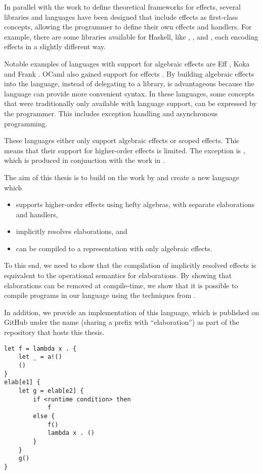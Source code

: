 In parallel with the work to define theoretical frameworks for effects, several libraries and languages have been designed that include effects as first-class concepts, allowing the programmer to define their own effects and handlers. For example, there are some libraries available for Haskell, like , ,  and , each encoding effects in a slightly different way.

Notable examples of languages with support for algebraic effects are Eff \cite{bauer_programming_2015}, Koka \cite{leijen_type_2017} and Frank \cite{lindley_be_2017}. OCaml also gained support for effects \cite{sivaramakrishnan_retrofitting_2021}. By building algebraic effects into the language, instead of delegating to a library, is advantageous because the language can provide more convenient syntax. In these languages, some concepts that were traditionally only available with language support, can be expressed by the programmer. This includes exception handling and asynchronous programming.

These languages either only support algebraic effects or scoped effects. This means that their support for higher-order effects is limited. The exception is , which is produced in conjunction with the work in \cite{bach_poulsen_hefty_2023}.

The aim of this thesis is to build on the work by \citeauthor{bach_poulsen_hefty_2023} and create a new language which

\begin{itemize}
    \item supports higher-order effects using hefty algebras, with separate elaborations and handlers,
    \item implicitly resolves elaborations, and
    \item can be compiled to a representation with only algebraic effects.
\end{itemize}

To this end, we need to show that the compilation of implicitly resolved effects is equivalent to the operational semantics for elaborations. By showing that elaborations can be removed at compile-time, we show that it is possible to compile programs in our language using the techniques from \cite{leijen_type_2017}.

In addition, we provide an implementation of this language, which is published on GitHub under the name  (sharing a prefix with ``elaboration'') as part  of the repository that hosts this thesis.


\begin{lstlisting}[style=fancy]
let f = lambda x . {
    let _ = a!()
    ()
}
elab[e1] {
    let g = elab[e2] {
        if <runtime condition> then
            f
        else {
            f()
            lambda x . ()
        }
    }
    g()
}
\end{lstlisting}